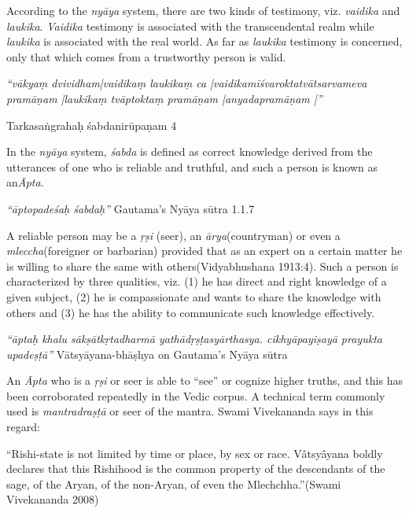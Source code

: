 According to the \textit{nyāya} system, there are two kinds of testimony, viz. \textit{vaidika} and \textit{laukika}. \textit{Vaidika} testimony is associated with the transcendental realm while \textit{laukika} is associated with the real world. As far as \textit{laukika} testimony is concerned, only that which comes from a trustworthy person is valid.

\begin{myquote}
\textit{“vākyaṃ dvividham|vaidikaṃ laukikaṃ ca |vaidikamīśvaroktatvātsarvameva pramāṇam |laukikaṃ tvāptoktaṃ pramāṇam |anyadapramāṇam |”}
\end{myquote}

\begin{center}
Tarkasaṅgrahaḥ śabdanirūpaṇam 4
\end{center}

In the \textit{nyāya} system, \textit{śabda} is defined as correct knowledge derived from the utterances of one who is reliable and truthful, and such a person is known as an\textit{Āpta}.

\begin{myquote}
\textit{“āptopadeśaḥ śabdaḥ”} Gautama’s Nyāya sūtra 1.1.7
\end{myquote}

A reliable person may be a \textit{ṛṣi} (seer), an \textit{ārya}(countryman) or even a \textit{mleccha}(foreigner or barbarian) provided that as an expert on a certain matter he is willing to share the same with others(Vidyabhushana 1913:4). Such a person is characterized by three qualities, viz. (1) he has direct and right knowledge of a given subject, (2) he is compassionate and wants to share the knowledge with others and (3) he has the ability to communicate such knowledge effectively.

\begin{myquote}
\textit{“āptaḥ khalu sākṣātkṛtadharmā yathādṛṣṭasyārthasya. cikhyāpayiṣayā prayukta upadeṣṭā”} Vātsyāyana-bhāṣhya on Gautama’s Nyāya sūtra
\end{myquote}

An \textit{Āpta} who is a \textit{ṛṣi} or seer is able to “see” or cognize higher truths, and this has been corroborated repeatedly in the Vedic corpus. A technical term commonly used is \textit{mantradraṣṭā} or seer of the mantra. Swami Vivekananda says in this regard:

\begin{myquote}
“Rishi-state is not limited by time or place, by sex or race. Vâtsyâyana boldly declares that this Rishihood is the common property of the descendants of the sage, of the Aryan, of the non-Aryan, of even the Mlechchha.”(Swami Vivekananda 2008)
\end{myquote}

